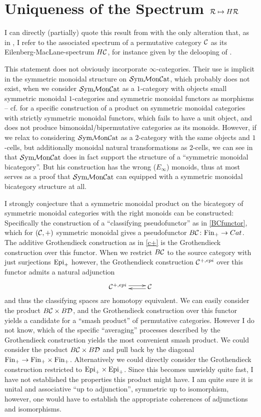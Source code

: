 \section{Uniqueness of the Spectrum $\mathcal{R}\mapsto H\mathcal{R}$}
I can directly (partially) quote this result from 
\cite{GGN} with the only alteration that, as in \cite{BDRR2011},
I refer to the associated spectrum of a permutative category 
$\mathcal{C}$ as its Eilenberg-MacLane-spectrum $H\mathcal{C}$, for instance given
by the delooping of \cite{EM}.
{}

This statement does not obviously incorporate $\infty$-categories. Their
use is implicit in the symmetric monoidal structure on $\mathcal{S}\mathrm{ym}\mathcal{M}\mathrm{on}\mathcal{C}\mathrm{at}$, which
probably does not exist, when we consider $\mathcal{S}\mathrm{ym}\mathcal{M}\mathrm{on}\mathcal{C}\mathrm{at}$ as a $1$-category 
with objects small symmetric monoidal $1$-categories and symmetric 
monoidal functors as morphisms -- cf. \cite{K} for a specific
construction of a product on symmetric monoidal categories with strictly
symmetric monoidal functors, which fails to have a unit object, and
does not produce bimonoidal/bipermutative categories as its monoids.
However, if we relax to considering $\mathcal{S}\mathrm{ym}\mathcal{M}\mathrm{on}\mathcal{C}\mathrm{at}$ as a $2$-category with
the same objects and $1$-cells, but additionally monoidal natural 
transformations as $2$-cells, we can see in \cite{Schm} that $\mathcal{S}\mathrm{ym}\mathcal{M}\mathrm{on}\mathcal{C}\mathrm{at}$
does in fact support the structure of a ``symmetric monoidal bicategory''. 
But his construction has the wrong ($E_\infty$) monoids, thus at most
serves as a proof that $\mathcal{S}\mathrm{ym}\mathcal{M}\mathrm{on}\mathcal{C}\mathrm{at}$ can equipped with a symmetric monoidal
bicategory structure at all. 

I strongly conjecture that a symmetric monoidal product on the 
bicategory of symmetric monoidal categories with the right monoids can 
be constructed:	Specifically the construction of a ``classifying 
pseudofunctor'' as in \ref{BCfunctor}, which for $(\mathcal{C},+)$ symmetric 
monoidal gives a pseudofunctor $B\mathcal{C}\colon \mathrm{Fin}_+\rightarrow Cat$. The 
additive Grothendieck construction as in \ref{c+} is the Grothendieck 
construction over this functor. When we restrict $B\mathcal{C}$ to the source 
category with just surjections $\mathrm{Epi}_+$ however, the Grothendieck 
construction $\mathcal{C}^{+,epi}$  over this functor admits a natural adjunction 
\[\xymatrix{\C^{+,epi} \ar@<0.5ex>[r] & \ar@<0.5ex>[l] \C}\]
and thus the classifying spaces are homotopy equivalent. 
We can easily consider the product $B\mathcal{C}\times B\mathcal{D}$, and the Grothendieck
construction over this functor yields a candidate for a ``smash product''
of permutative categories. However I do not know, which of the specific
``averaging'' processes described by the Grothendieck construction 
yields the most convenient smash product. We could consider the
product $B\mathcal{C}\times B\mathcal{D}$ and pull back by the diagonal $\mathrm{Fin}_+\rightarrow
\mathrm{Fin}_+\times\mathrm{Fin}_+$. Alternatively we could directly consider the Grothendieck
construction restricted to $\mathrm{Epi}_+\times\mathrm{Epi}_+$. Since this becomes unwieldy 
quite fast, I have not established the properties this product might have.
I am quite sure it is unital and associative ``up to adjunction'', symmetric
up to isomorphism, however, one would have to establish the appropriate
coherences of adjunctions and isomorphisms.

